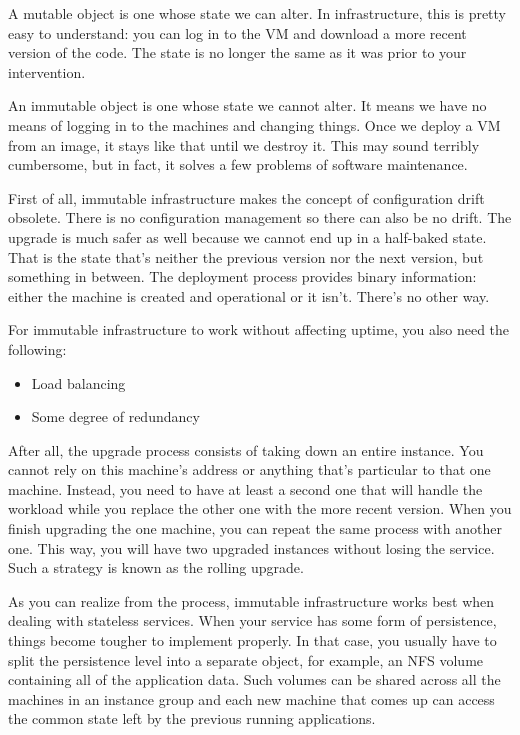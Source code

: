 A mutable object is one whose state we can alter. In infrastructure, this is pretty easy to understand: you can log in to the VM and download a more recent version of the code. The state is no longer the same as it was prior to your intervention.

An immutable object is one whose state we cannot alter. It means we have no means of logging in to the machines and changing things. Once we deploy a VM from an image, it stays like that until we destroy it. This may sound terribly cumbersome, but in fact, it solves a few problems of software maintenance.


First of all, immutable infrastructure makes the concept of configuration drift obsolete. There is no configuration management so there can also be no drift. The upgrade is much safer as well because we cannot end up in a half-baked state. That is the state that's neither the previous version nor the next version, but something in between. The deployment process provides binary information: either the machine is created and operational or it isn't. There's no other way.

For immutable infrastructure to work without affecting uptime, you also need the following:

\begin{itemize}
\item 
Load balancing

\item 
Some degree of redundancy
\end{itemize}

After all, the upgrade process consists of taking down an entire instance. You cannot rely on this machine's address or anything that's particular to that one machine. Instead, you need to have at least a second one that will handle the workload while you replace the other one with the more recent version. When you finish upgrading the one machine, you can repeat the same process with another one. This way, you will have two upgraded instances without losing the service. Such a strategy is known as the rolling upgrade.

As you can realize from the process, immutable infrastructure works best when dealing with stateless services. When your service has some form of persistence, things become tougher to implement properly. In that case, you usually have to split the persistence level into a separate object, for example, an NFS volume containing all of the application data. Such volumes can be shared across all the machines in an instance group and each new machine that comes up can access the common state left by the previous running applications.

